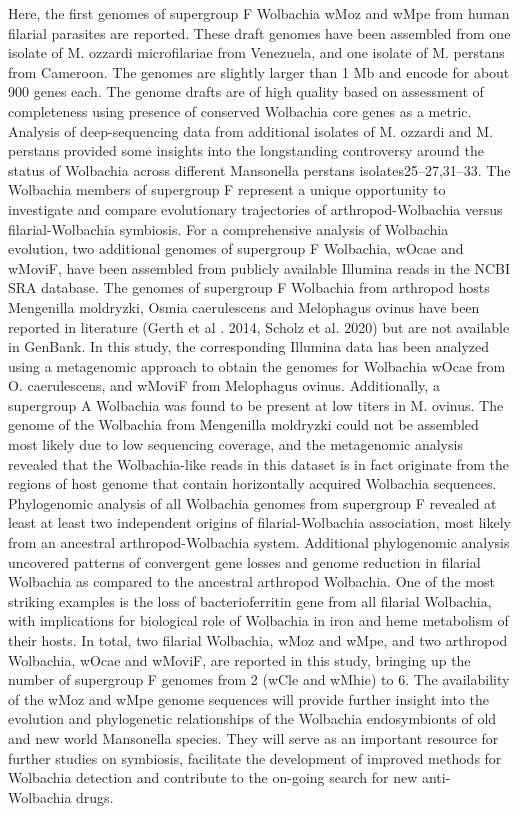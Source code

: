 \documentclass[10pt, a4paper, twocolumn]{article} %
\begin{document}
Here, the first genomes of supergroup F Wolbachia wMoz and wMpe from human filarial parasites are reported. These draft genomes have been assembled from one isolate of M. ozzardi microfilariae from Venezuela, and one isolate of M. perstans from Cameroon. The genomes are slightly larger than 1 Mb and encode for about 900 genes each. The genome drafts are of high quality based on assessment of completeness using presence of conserved Wolbachia core genes as a metric. Analysis of deep-sequencing data from additional isolates of M. ozzardi and M. perstans provided some insights into the longstanding controversy around the status of Wolbachia across different Mansonella perstans isolates25–27,31–33. 
The Wolbachia members of supergroup F represent a unique opportunity to investigate and compare evolutionary trajectories of arthropod-Wolbachia versus filarial-Wolbachia symbiosis. For a comprehensive analysis of Wolbachia evolution, two additional genomes of supergroup F Wolbachia, wOcae and wMoviF, have been assembled from publicly available Illumina reads in the NCBI SRA database. The genomes of supergroup F Wolbachia from arthropod hosts Mengenilla moldryzki, Osmia caerulescens and Melophagus ovinus have been reported in literature (Gerth et al . 2014, Scholz et al. 2020) but are not available in GenBank. In this study, the corresponding Illumina data has been analyzed using a metagenomic approach to obtain the genomes for Wolbachia wOcae from O. caerulescens, and wMoviF from Melophagus ovinus. Additionally, a supergroup A Wolbachia was found to be present at low titers in M. ovinus. The genome of the Wolbachia from Mengenilla moldryzki could not be assembled most likely due to low sequencing coverage, and the metagenomic analysis revealed that the Wolbachia-like reads in this dataset is in fact originate from the regions of host genome that contain horizontally acquired Wolbachia sequences.
Phylogenomic analysis of all Wolbachia genomes from supergroup F revealed at least at least two independent origins of filarial-Wolbachia association, most likely from an ancestral arthropod-Wolbachia system. Additional phylogenomic analysis uncovered patterns of convergent gene losses and genome reduction in filarial Wolbachia as compared to the ancestral arthropod Wolbachia. One of the most striking examples is the loss of bacterioferritin gene from all filarial Wolbachia, with implications for biological role of Wolbachia in iron and heme metabolism of their hosts. 
In total, two filarial Wolbachia, wMoz and wMpe, and two arthropod Wolbachia, wOcae and wMoviF, are reported in this study, bringing up the number of supergroup F genomes from 2 (wCle and wMhie) to 6. The availability of the wMoz and wMpe genome sequences will provide further insight into the evolution and phylogenetic relationships of the Wolbachia endosymbionts of old and new world Mansonella species.  They will serve as an important resource for further studies on symbiosis, facilitate the development of improved methods for Wolbachia detection and contribute to the on-going search for new anti-Wolbachia drugs.
\end{document}
